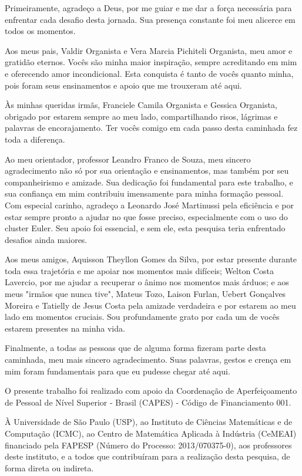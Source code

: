 Primeiramente, agradeço a Deus, por me guiar e me dar a força necessária para enfrentar cada desafio desta jornada. Sua presença constante foi meu alicerce em todos os momentos.

Aos meus pais, Valdir Organista e Vera Marcia Pichiteli Organista, meu amor e gratidão eternos. Vocês são minha maior inspiração, sempre acreditando em mim e oferecendo amor incondicional. Esta conquista é tanto de vocês quanto minha, pois foram seus ensinamentos e apoio que me trouxeram até aqui.

Às minhas queridas irmãs, Franciele Camila Organista e Gessica Organista, obrigado por estarem sempre ao meu lado, compartilhando risos, lágrimas e palavras de encorajamento. Ter vocês comigo em cada passo desta caminhada fez toda a diferença.

Ao meu orientador, professor Leandro Franco de Souza, meu sincero agradecimento não só por sua orientação e ensinamentos, mas também por seu companheirismo e amizade. Sua dedicação foi fundamental para este trabalho, e sua confiança em mim contribuiu imensamente para minha formação pessoal. Com especial carinho, agradeço a Leonardo José Martinussi pela eficiência e por estar sempre pronto a ajudar no que fosse preciso, especialmente com o uso do cluster Euler. Seu apoio foi essencial, e sem ele, esta pesquisa teria enfrentado desafios ainda maiores.

Aos meus amigos, Aquisson Theyllon Gomes da Silva, por estar presente durante toda essa trajetória e me apoiar nos momentos mais difíceis; Welton Costa Lavercio, por me ajudar a recuperar o ânimo nos momentos mais árduos; e aos meus "irmãos que nunca tive", Mateus Tozo, Laison Furlan, Uebert Gonçalves Moreira e Tatielly de Jesus Costa pela amizade verdadeira e por estarem ao meu lado em momentos cruciais. Sou profundamente grato por cada um de vocês estarem presentes na minha vida.

Finalmente, a todas as pessoas que de alguma forma fizeram parte desta caminhada, meu mais sincero agradecimento. Suas palavras, gestos e crença em mim foram fundamentais para que eu pudesse chegar até aqui.

O presente trabalho foi realizado com apoio da Coordenação de Aperfeiçoamento de Pessoal de Nível Superior - Brasil (CAPES) - Código de Financiamento 001.

À Universidade de São Paulo (USP), ao Instituto de Ciências Matemáticas e de Computação (ICMC), ao Centro de Matemática Aplicada à Indústria (CeMEAI) financiado pela FAPESP (Número do Processo: 2013/070375-0), aos professores deste instituto, e a todos que contribuíram para a realização desta pesquisa, de forma direta ou indireta.

